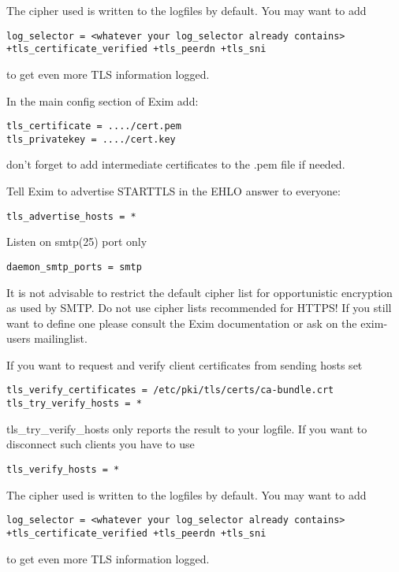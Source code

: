 The cipher used is written to the logfiles by default. You may want to add
\begin{lstlisting}
log_selector = <whatever your log_selector already contains> +tls_certificate_verified +tls_peerdn +tls_sni
\end{lstlisting}
to get even more TLS information logged.


In the main config section of Exim add:

\begin{lstlisting}
tls_certificate = ..../cert.pem
tls_privatekey = ..../cert.key
\end{lstlisting}
don't forget to add intermediate certificates to the .pem file if needed.

Tell Exim to advertise STARTTLS in the EHLO answer to everyone:
\begin{lstlisting}
tls_advertise_hosts = *
\end{lstlisting}

Listen on smtp(25) port only
\begin{lstlisting}
daemon_smtp_ports = smtp
\end{lstlisting}

It is not advisable to restrict the default cipher list for opportunistic encryption as used by SMTP. Do not use cipher lists recommended for HTTPS! If you still want to define one please consult the Exim documentation or ask on the exim-users mailinglist.

If you want to request and verify client certificates from sending hosts set
\begin{lstlisting}
tls_verify_certificates = /etc/pki/tls/certs/ca-bundle.crt
tls_try_verify_hosts = *
\end{lstlisting}

tls\_try\_verify\_hosts only reports the result to your logfile. If you want to disconnect such clients you have to use
\begin{lstlisting}
tls_verify_hosts = *
\end{lstlisting}

The cipher used is written to the logfiles by default. You may want to add
\begin{lstlisting}
log_selector = <whatever your log_selector already contains> +tls_certificate_verified +tls_peerdn +tls_sni
\end{lstlisting}
to get even more TLS information logged.

